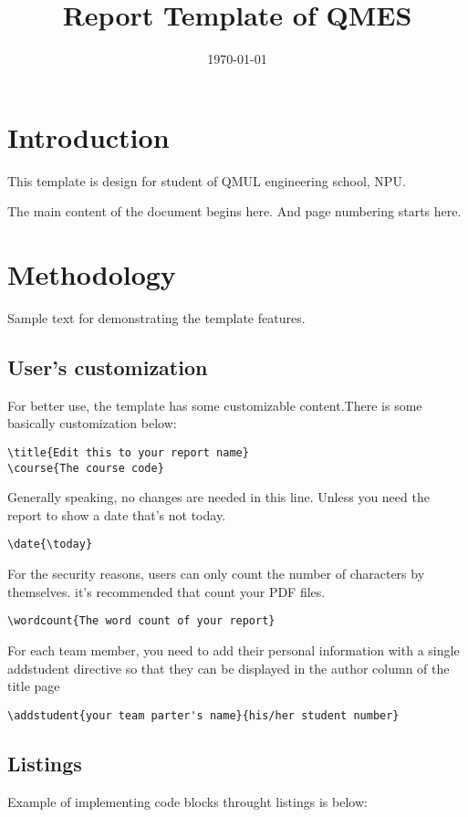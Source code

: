 \documentclass{qmes-template}
\title{Report Template of QMES}
\date{\today}
\begin{document}
\maketitle
\tableofcontents

\section{Introduction}
This template is design for student of QMUL engineering school, NPU.

The main content of the document begins here. And page numbering starts here.

\section{Methodology}
Sample text for demonstrating the template features.

\subsection{User's customization}
For better use, the template has some customizable content.There is some
basically customization below:
\begin{lstlisting}
\title{Edit this to your report name}
\course{The course code}
\end{lstlisting}

Generally speaking, no changes are needed in this line. Unless you need the
report to show a date that's not today.
\begin{lstlisting}
\date{\today}
\end{lstlisting}

For the security reasons, users can only count the number of characters by
themselves. it's recommended that count your PDF files.
\begin{lstlisting}
\wordcount{The word count of your report}
\end{lstlisting}

For each team member, you need to add their personal information with a single
addstudent directive so that they can be displayed in the author column of the
title page
\begin{lstlisting}
\addstudent{your team parter's name}{his/her student number}
\end{lstlisting}

\subsection{Listings}
Example of implementing code blocks throught listings is below:
\end{document}
